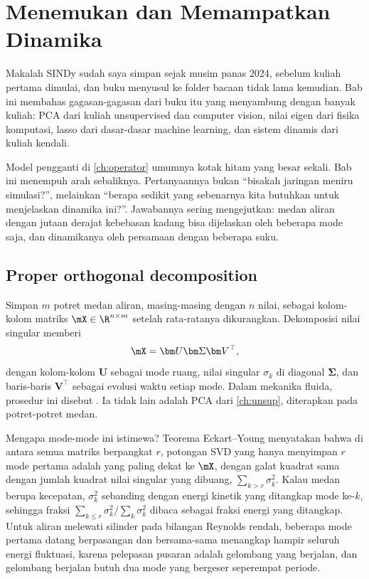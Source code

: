 \chapter{Menemukan dan Memampatkan Dinamika}
\label{ch:penemuan}

Makalah SINDy \citep{brunton2016} sudah saya simpan sejak musim panas 2024, sebelum kuliah pertama
dimulai, dan buku \citet{brunton2022} menyusul ke folder bacaan tidak lama kemudian. Bab ini membahas
gagasan-gagasan dari buku itu yang menyambung dengan banyak kuliah: PCA dari kuliah unsupervised dan
computer vision, nilai eigen dari fisika komputasi, lasso dari dasar-dasar machine learning, dan sistem
dinamis dari kuliah kendali.

Model pengganti di \cref{ch:operator} umumnya kotak hitam yang besar sekali. Bab ini menempuh arah
sebaliknya. Pertanyaannya bukan ``bisakah jaringan meniru simulasi?'', melainkan ``berapa sedikit yang
sebenarnya kita butuhkan untuk menjelaskan dinamika ini?''. Jawabannya sering mengejutkan: medan aliran
dengan jutaan derajat kebebasan kadang bisa dijelaskan oleh beberapa mode saja, dan dinamikanya oleh
persamaan dengan beberapa suku.

\section{Proper orthogonal decomposition}

Simpan $m$ potret medan aliran, masing-masing dengan $n$ nilai, sebagai kolom-kolom matriks
$\mX\in\R^{n\times m}$ setelah rata-ratanya dikurangkan. Dekomposisi nilai singular memberi
\begin{equation}
\mX=\bm U\bm\Sigma\bm V^\top,
\end{equation}
dengan kolom-kolom $\bm U$ sebagai mode ruang, nilai singular $\sigma_k$ di diagonal $\bm\Sigma$, dan
baris-baris $\bm V^\top$ sebagai evolusi waktu setiap mode. Dalam mekanika fluida, prosedur ini disebut
 \citep{berkooz1993,taira2017}. Ia tidak lain adalah PCA dari
\cref{ch:unsup}, diterapkan pada potret-potret medan.

Mengapa mode-mode ini istimewa? Teorema Eckart--Young menyatakan bahwa di antara semua matriks berpangkat
$r$, potongan SVD yang hanya menyimpan $r$ mode pertama adalah yang paling dekat ke $\mX$, dengan galat
kuadrat sama dengan jumlah kuadrat nilai singular yang dibuang, $\sum_{k>r}\sigma_k^2$. Kalau medan berupa
kecepatan, $\sigma_k^2$ sebanding dengan energi kinetik yang ditangkap mode ke-$k$, sehingga fraksi
$\sum_{k\le r}\sigma_k^2/\sum_k\sigma_k^2$ dibaca sebagai fraksi energi yang ditangkap. Untuk aliran
melewati silinder pada bilangan Reynolds rendah, beberapa mode pertama datang berpasangan dan bersama-sama
menangkap hampir seluruh energi fluktuasi, karena pelepasan pusaran adalah gelombang yang berjalan,
dan gelombang berjalan butuh dua mode yang bergeser seperempat periode.

